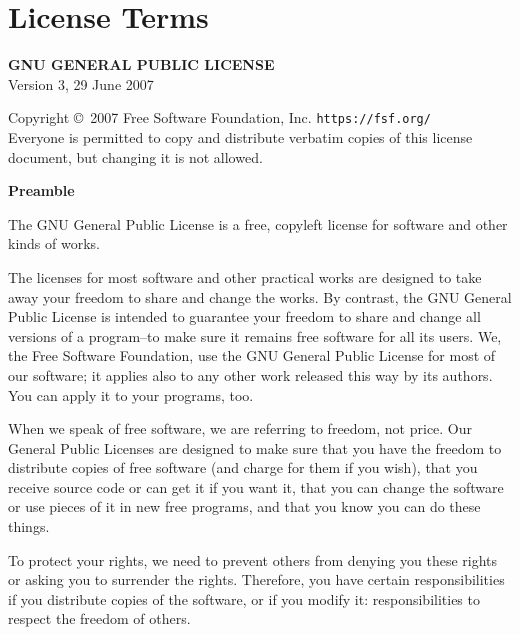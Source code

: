 \documentclass[11pt,twoside,fleqn,openright,titlepage]{cslreport}
\begin{document}
\appendix
\chapter{License Terms}
\label{license}

\begin{small}

\begin{center}
{\bf GNU GENERAL PUBLIC LICENSE}\\

Version 3, 29 June 2007\\

{\parindent 0in

Copyright \copyright\  2007 Free Software Foundation, Inc. \texttt{https://fsf.org/}\\

\bigskip
Everyone is permitted to copy and distribute verbatim copies of this
license document, but changing it is not allowed.}
\end{center}

\begin{center}
{\bf Preamble}
\end{center}
The GNU General Public License is a free, copyleft license for
software and other kinds of works.

The licenses for most software and other practical works are designed
to take away your freedom to share and change the works.  By contrast,
the GNU General Public License is intended to guarantee your freedom to
share and change all versions of a program--to make sure it remains free
software for all its users.  We, the Free Software Foundation, use the
GNU General Public License for most of our software; it applies also to
any other work released this way by its authors.  You can apply it to
your programs, too.

When we speak of free software, we are referring to freedom, not
price.  Our General Public Licenses are designed to make sure that you
have the freedom to distribute copies of free software (and charge for
them if you wish), that you receive source code or can get it if you
want it, that you can change the software or use pieces of it in new
free programs, and that you know you can do these things.

To protect your rights, we need to prevent others from denying you
these rights or asking you to surrender the rights.  Therefore, you have
certain responsibilities if you distribute copies of the software, or if
you modify it: responsibilities to respect the freedom of others.


\end{small}
\end{document}
